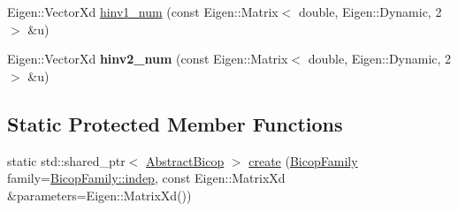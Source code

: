 {\bf }\par
\begin{DoxyCompactItemize}
\item 
Eigen\+::\+Vector\+Xd \hyperlink{classvinecopulib_1_1_abstract_bicop_a7dc5b05857ece56b7e336e1175387a8e}{hinv1\+\_\+num} (const Eigen\+::\+Matrix$<$ double, Eigen\+::\+Dynamic, 2 $>$ \&u)
\item 
Eigen\+::\+Vector\+Xd {\bfseries hinv2\+\_\+num} (const Eigen\+::\+Matrix$<$ double, Eigen\+::\+Dynamic, 2 $>$ \&u)\hypertarget{classvinecopulib_1_1_abstract_bicop_a8e1077b6f22785f1f4c5fa09b47dae7a}{}\label{classvinecopulib_1_1_abstract_bicop_a8e1077b6f22785f1f4c5fa09b47dae7a}

\end{DoxyCompactItemize}

\subsection*{Static Protected Member Functions}
{\bf }\par
\begin{DoxyCompactItemize}
\item 
static std\+::shared\+\_\+ptr$<$ \hyperlink{classvinecopulib_1_1_abstract_bicop}{Abstract\+Bicop} $>$ \hyperlink{classvinecopulib_1_1_abstract_bicop_afefe048baabaa8cd14e849e66a45c428}{create} (\hyperlink{namespacevinecopulib_a42e95cc06d33896199caab0c11ad44f3}{Bicop\+Family} family=\hyperlink{namespacevinecopulib_a42e95cc06d33896199caab0c11ad44f3af49b022096e968010a7b9bd941805a65}{Bicop\+Family\+::indep}, const Eigen\+::\+Matrix\+Xd \&parameters=Eigen\+::\+Matrix\+Xd())
\end{DoxyCompactItemize}

